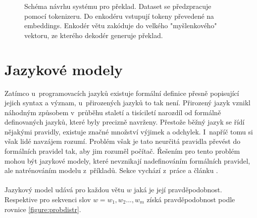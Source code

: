\begin{figure}[H]
    \begin{center}
    \end{center}
	\caption{Schéma návrhu systému pro překlad. Dataset se předzpracuje pomocí tokenizeru. Do enkodéru vstupují tokeny převedené na embeddings. Enkodér větu zakóduje do velkého "myšlenkového" vektoru, ze kterého dekodér generuje překlad.}
	\label{img:draft}
\end{figure}



\section{Jazykové modely}\label{section:langmodel}
Zatímco u~programovacích jazyků existuje formální definice přesně popisující jejich syntax a význam, u~přirozených jazyků to tak není. Přirozený jazyk vznikl náhodným způsobem v~průběhu staletí a tisíciletí narozdíl od formálně definovaných jazyků, které byly precizně navrženy. Přestože běžný jazyk se řídí nějakými pravidly, existuje značné množství výjimek a odchylek. I~napříč tomu si však lidé navzájem rozumí. Problém však je tato neurčitá pravidla převést do formálních pravidel tak, aby jim rozuměl počítač. Řešením pro tento problém mohou být jazykové modely, které nevznikají nadefinováním formálních pravidel, ale natrénováním modelu z~příkladů. Sekce vychází z~práce \cite{nmtThesis} a článku \cite{nmtTutorial}.
\\\\
Jazykový model udává pro každou větu $w$ jaká je její pravděpodobnost. Respektive pro sekvenci slov $w = w_1, w_2..., w_m$ získá pravděpodobnost podle rovnice \ref{figure:probdistr}.

